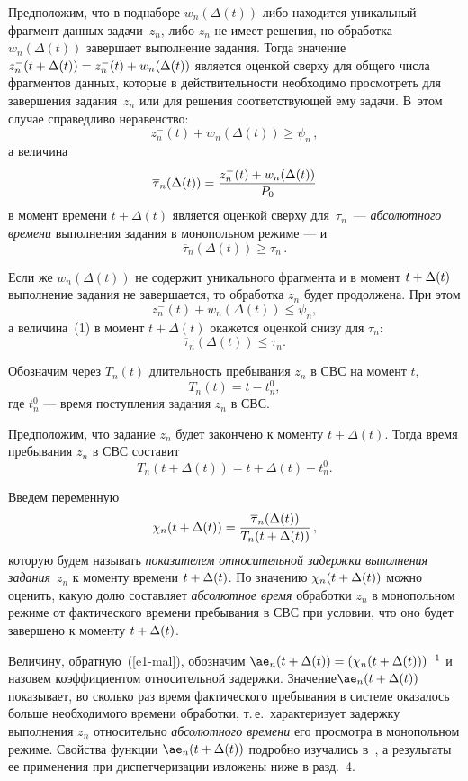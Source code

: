 \begin{multicols}{2}
Предположим, что в поднаборе $w_{n}(\Delta(t))$ либо находится
уникальный фрагмент данных задачи~$z_n$, либо $z_n$ не имеет
решения, но обработка $w_{n}(\Delta(t))$ завершает  выполнение
задания. Тогда значение $ z^-_{n}(t \hm+ \Delta(t))\hm=
z^-_{n}(t)\hm + w_{n}(\Delta(t))$ является оценкой сверху для общего
числа фрагментов данных, которые  в действительности необходимо
просмотреть для завершения задания~$z_n$   или для решения
соответствующей ему задачи. В~этом случае справедливо неравенство:
$$
 z^-_{n}(t) + w_{n}(\Delta(t)) \ge \psi_n\,,
 $$
а величина
\begin{equation}
\overline{\tau}_n (\Delta(t)) = \displaystyle\frac{\displaystyle z^-_{n}(t) + w_{n}(\Delta(t))\mathstrut}{\displaystyle P_0\mathstrut} 
\label{e1a-mal}
\end{equation}
в момент времени $t + \Delta(t)$ является оценкой сверху для~$\tau_n$~--- 
\textit{абсолютного времени} выполнения задания в монопольном режиме --- и
$$
 \overline{\tau}_n (\Delta(t))  \ge \tau_n\,.
 $$

Если же $w_{n}(\Delta(t))$ не содержит уникального фрагмента и в
момент  $t \hm+ \Delta(t)$  выполнение задания не
завершается, то обработка $z_n$ будет продолжена. При этом
\[ z^-_{n}(t) + w_{n}(\Delta(t)) \le \psi_n, \]
а величина~(1) в момент  $t+ \Delta(t)$ окажется оценкой снизу для $\tau_n$:
\[ \overline{\tau}_n (\Delta(t))  \le \tau_n.\]


Обозначим через $T_n(t)$ длительность пребывания  $z_n$ в СВС на момент $t$,
\[T_n (t)= t  - t_n^0, \]
где  $t_n^0$ --- время поступления задания $z_n$ в СВС.

Предположим, что  задание $z_n$ будет  закончено к моменту $t +
\Delta(t)$. Тогда время пребывания $z_n$ в СВС составит
\[T_n (t + \Delta(t))= t  + \Delta(t) - t_n^0. \]

Введем переменную
\begin{equation}
\chi_n (t + \Delta(t)) = \displaystyle\frac{\displaystyle \overline{\tau}_n (\Delta(t))\mathstrut}{\displaystyle T_n (t + \Delta(t))\mathstrut}\,,
\label{e1-mal}
\end{equation}
которую будем называть \textit{показателем относительной задержки
выполнения задания}~$z_{n}$ к моменту времени $t \hm+ \Delta(t)$. По
значению $\chi_n(t \hm+ \Delta(t))$ можно оценить, какую долю
составляет \textit{абсолютное время} обработки  $z_n$ в монопольном
режиме от фактического времени пребывания в СВС при условии, что оно
будет завершено к моменту $t \hm+ \Delta(t)$.

Величину, обратную~(\ref{e1-mal}), обозначим  $\ae_n (t \hm+ \Delta(t))\hm =
(\chi_n (t + \Delta(t)))^{-1}$ и назовем коэф\-фи\-циентом относительной
задержки. Значение\linebreak ${\ae}_n (t\hm + \Delta(t))$ показывает, во сколько
раз   время фактического пребывания в системе оказалось больше
необходимого времени обработки, т.\,е.\ характеризует задержку
выполнения $z_n$ относительно \textit{абсолютного времени} его
просмотра в монопольном режиме. Свойства функции ${\ae}_n (t \hm+
\Delta(t))$ подробно изучались в~\cite{Prep11, Gol12}, а результаты
ее применения при диспетчеризации изложены ниже в разд.~4.


\end{multicols}
